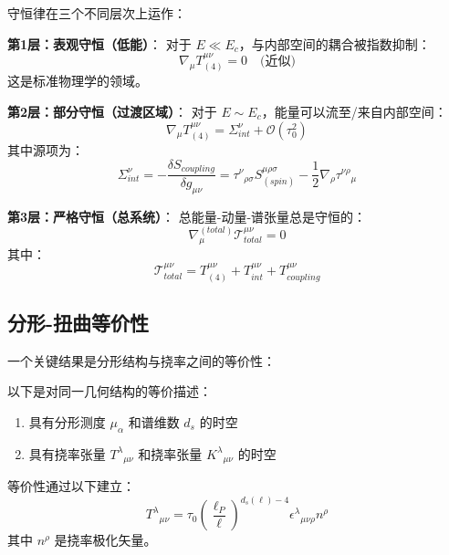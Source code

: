 守恒律在三个不同层次上运作：

\textbf{第1层：表观守恒（低能）}：
对于 $E \ll E_c$，与内部空间的耦合被指数抑制：
\begin{equation}
    \nabla_\mu T^{\mu\nu}_{(4)} = 0 \quad \text{(近似)}
\end{equation}
这是标准物理学的领域。

\textbf{第2层：部分守恒（过渡区域）}：
对于 $E \sim E_c$，能量可以流至/来自内部空间：
\begin{equation}
    \nabla_\mu T^{\mu\nu}_{(4)} = \Sigma^\nu_{int} + \mathcal{O}(\tau_0^2)
\end{equation}
其中源项为：
\begin{equation}
    \Sigma^\nu_{int} = -\frac{\delta S_{coupling}}{\delta g_{\mu\nu}} = \tau^\nu{}_{\rho\sigma} S^{\mu\rho\sigma}_{(spin)} - \frac{1}{2}\nabla_\rho \tau^{\nu\rho}{}_\mu
\end{equation}

\textbf{第3层：严格守恒（总系统）}：
总能量-动量-谱张量总是守恒的：
\begin{equation}
    \nabla^{(total)}_\mu \mathcal{T}^{\mu\nu}_{total} = 0
\end{equation}
其中：
\begin{equation}
    \mathcal{T}^{\mu\nu}_{total} = T^{\mu\nu}_{(4)} + T^{\mu\nu}_{int} + T^{\mu\nu}_{coupling}
\end{equation}

\subsection{分形-扭曲等价性}

一个关键结果是分形结构与挠率之间的等价性：

\begin{theorem}[分形-扭曲对偶性]
以下是对同一几何结构的等价描述：
\begin{enumerate}
    \item 具有分形测度 $\mu_\alpha$ 和谱维数 $d_s$ 的时空
    \item 具有挠率张量 $T^\lambda{}_{\mu\nu}$ 和挠率张量 $K^\lambda{}_{\mu\nu}$ 的时空
\end{enumerate}
\end{theorem}

等价性通过以下建立：
\begin{equation}
    T^\lambda{}_{\mu\nu} = \tau_0 \left(\frac{\ell_P}{\ell}\right)^{d_s(\ell) - 4} \epsilon^\lambda{}_{\mu\nu\rho} n^\rho
\end{equation}
其中 $n^\rho$ 是挠率极化矢量。

